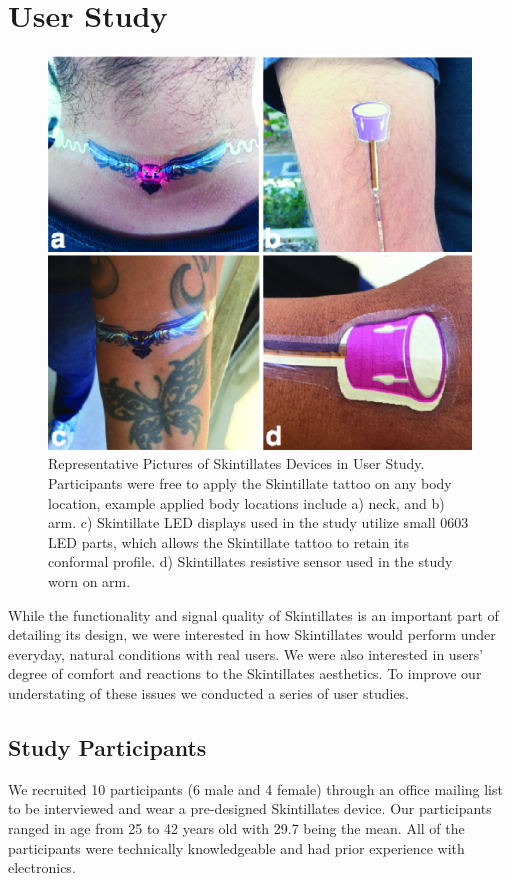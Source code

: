 \documentclass{sigchi}
\begin{document}
\section {User Study}
\begin{figure} [b!]
\centering
\includegraphics[width=1\columnwidth]{figures/Figure11}
\caption{Representative Pictures of Skintillates Devices in User Study. Participants were free to apply the Skintillate tattoo on any body location, example applied body locations include a) neck, and b) arm. c) Skintillate LED displays used in the study utilize small 0603 LED parts, which allows the Skintillate tattoo to retain its conformal profile. d) Skintillates resistive sensor used in the study worn on arm. }
\vspace{-8pt}
\label{fig:userstudy}
\end{figure}
While the functionality and signal quality of Skintillates is an important part of detailing its design, we were interested in how Skintillates would perform under everyday, natural conditions with real users.  We were also interested in users’ degree of comfort and reactions to the Skintillates aesthetics.  To improve our understating of these issues we conducted a series of user studies.
\subsection {Study Participants}
We recruited 10 participants (6 male and 4 female) through an office mailing list to be interviewed and wear a pre-designed Skintillates device.  Our participants ranged in age from 25 to 42 years old with 29.7 being the mean.   All of the participants were technically knowledgeable and had prior experience with electronics.
\end{document}
